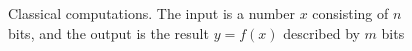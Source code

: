 \begin{figure}
\centering



\caption{Classical computations. The input is a number $x$ consisting
  of $n$ bits, and the output is the result $y = f\left(x\right)$ described by $m$ bits}
\label{figQuantCompClassComp}
\end{figure}
